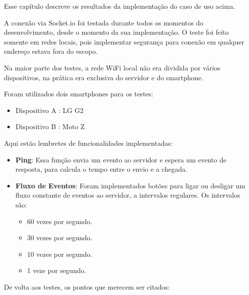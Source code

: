\documentclass[a4paper,12pt]{article}
\begin{document}
Esse capítulo descreve os resultados da implementação do caso de uso acima.

A conexão via Socket.io foi testada durante todos os momentos do desenvolvimento, desde o momento da sua implementação. O teste foi feito somente em redes locais, pois implementar segurança para conexão em qualquer endereço estava fora do escopo.

Na maior parte dos testes, a rede WiFi local não era dividida por vários dispositivos, na prática era exclusiva do servidor e do smartphone.

Foram utilizados dois smartphones para os testes:
\begin{itemize}
    \item Dispositivo A : LG G2
    \item Dispositivo B : Moto Z
\end{itemize}

Aqui estão lembretes de funcionalidades implementadas:

\begin{itemize}

    \item \textbf{Ping}: Essa função envia um evento ao servidor e espera um evento de resposta, para calcula o tempo entre o envio e a chegada.

    \item \textbf{Fluxo de Eventos}: Foram implementados botões para ligar ou desligar um fluxo constante de eventos ao servidor, a intervalos regulares. Os intervalos são:
    \begin{itemize}
        \item 60 vezes por segundo.
        \item 30 vezes por segundo.
        \item 10 vezes por segundo.
        \item 1 veze por segundo.
    \end{itemize}

\end{itemize}

De volta aos testes, os pontos que merecem ser citados:
\end{document}
